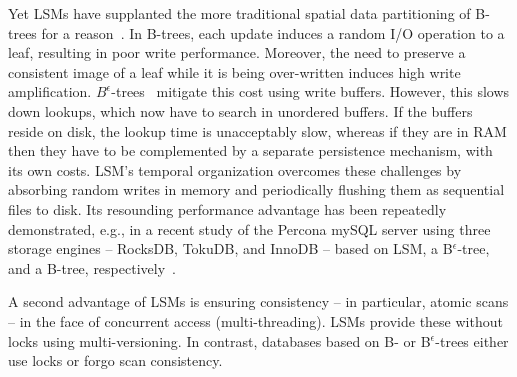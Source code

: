 Yet  LSMs have supplanted the more traditional spatial data partitioning of B-trees for a reason~\cite{rocks-vs-inno}.
In  B-trees, each update induces a random I/O operation to a leaf, resulting in poor write performance.
Moreover, the need to preserve a consistent image of a leaf while it is being over-written induces high write amplification. 
$B^{\epsilon}$-trees~\cite{Brodal:2003:LBE:644108.644201} mitigate this cost using write buffers. %
However, this slows down lookups, which now have to search in %
unordered buffers. 
If the buffers reside on disk, the lookup time is unacceptably slow, whereas
if they are in RAM then they have to be complemented by a separate persistence mechanism, with its own costs.  
LSM's temporal organization overcomes these challenges by absorbing random writes in memory and periodically flushing them as 
sequential files to disk. 
Its resounding performance advantage has been repeatedly demonstrated, 
e.g., in a recent  study of the Percona mySQL server using three storage engines -- RocksDB, TokuDB, and InnoDB --
based on LSM, a B$^{\epsilon}$-tree, and a B-tree, respectively~\cite{toku-rocks-inno}.




 
A second advantage of LSMs is ensuring consistency -- in particular, atomic scans --  in the face of concurrent access (multi-threading). 
LSMs provide these without locks using multi-versioning. 
In contrast, databases based on B- or  B$^\epsilon$-trees either use locks or forgo scan consistency.

